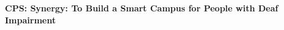 \documentclass[10pt]{article}
\begin{document}
\setcounter{page}{1}
\def\mysection{A}
\nsffoot {}

\begin{center}
\vspace{-6mm}
{\bf CPS: Synergy: To Build a Smart Campus for People with Deaf Impairment}
\end{center}
\vspace*{-2mm}

\vspace{-6pt}
\vspace*{.1in}
\pagebreak


\setcounter{page}{1}
\def\mysection{C}
\nsffoot {}
\def\thesection{\arabic{section}}
\def\thesubsection{\arabic{section}.\arabic{subsection}}
\def\thesubsubsection{\arabic{section}.\arabic{subsection}.\arabic{subsubsection}}




%

\newpage
\setcounter{page}{1}
\def\mysection{E}


\end{document}
